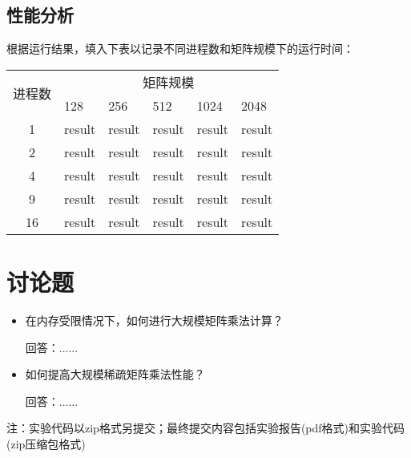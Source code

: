 \documentclass{SYSUReport}
\begin{document}
\subsection{性能分析}
根据运行结果，填入下表以记录不同进程数和矩阵规模下的运行时间：
\begin{table}[htpb]
\centering
\begin{tabular}{|c|lllll|}
\hline
\multirow{2}{*}{进程数} & \multicolumn{5}{c|}{矩阵规模}                                                                        \\ \cline{2-6} 
 & \multicolumn{1}{l|}{128} & \multicolumn{1}{l|}{256} & \multicolumn{1}{l|}{512} & \multicolumn{1}{l|}{1024} & 2048 \\ \hline
1                    & \multicolumn{1}{l|}{result} & \multicolumn{1}{l|}{result} & \multicolumn{1}{l|}{result} & \multicolumn{1}{l|}{result} &  result\\ \hline
2                    & \multicolumn{1}{l|}{result} & \multicolumn{1}{l|}{result} & \multicolumn{1}{l|}{result} & \multicolumn{1}{l|}{result} &  result\\ \hline
4                    & \multicolumn{1}{l|}{result} & \multicolumn{1}{l|}{result} & \multicolumn{1}{l|}{result} & \multicolumn{1}{l|}{result} &result  \\ \hline
9                    & \multicolumn{1}{l|}{result} & \multicolumn{1}{l|}{result} & \multicolumn{1}{l|}{result} & \multicolumn{1}{l|}{result} &result  \\ \hline
16                   & \multicolumn{1}{l|}{result} & \multicolumn{1}{l|}{result} & \multicolumn{1}{l|}{result} & \multicolumn{1}{l|}{result} &result  \\ \hline
\end{tabular}
\end{table}
\section{讨论题}
\begin{itemize}
    \item 在内存受限情况下，如何进行大规模矩阵乘法计算？

    回答：......
    \item 如何提高大规模稀疏矩阵乘法性能？

    回答：......
\end{itemize}
注：实验代码以zip格式另提交；最终提交内容包括实验报告(pdf格式)和实验代码(zip压缩包格式)
\end{document}
